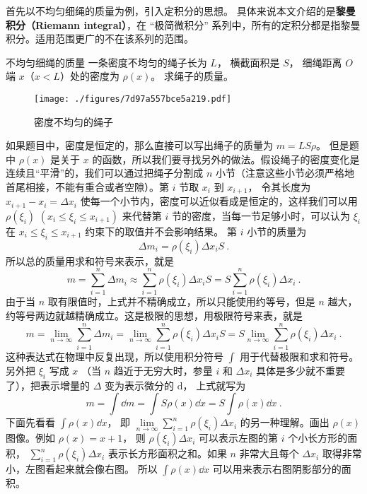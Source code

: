 

首先以不均匀细绳的质量为例，引入定积分的思想。 具体来说本文介绍的是\textbf{黎曼积分（Riemann integral）}，在 “极简微积分” 系列中，所有的定积分都是指黎曼积分。适用范围更广的不在该系列的范围。

\begin{example}{不均匀细绳的质量}\label{ex_DefInt_1}
一条密度不均匀的绳子长为 $L$， 横截面积是 $S$， 细绳距离 $O$ 端 $x$（$x<L$）处的密度为 $\rho(x)$。 求绳子的质量。

\begin{figure}[ht]
\centering
\texttt{[image: ./figures/7d97a557bce5a219.pdf]}
\caption{密度不均匀的绳子} \label{fig_DefInt_1}
\end{figure}

如果题目中，密度是恒定的，那么直接可以写出绳子的质量为 $m = LS\rho$。 但是题中 $\rho(x)$ 是关于 $x$ 的函数，所以我们要寻找另外的做法。假设绳子的密度变化是连续且“平滑”的，我们可以通过把绳子分割成 $n$ 小节（注意这些小节必须严格地首尾相接，不能有重合或者空隙）。第 $i$ 节取 $x_i$ 到 $x_{i +1}$， 令其长度为 $x_{i + 1} - {x_i} = \Delta x_i$ 使每一个小节内，密度可以近似看成是恒定的，这样我们可以用 $\rho(\xi_i)\,\, (x_i \leqslant \xi_i \leqslant x_{i + 1})$ 来代替第 $i$ 节的密度，当每一节足够小时，可以认为 $\xi_i$ 在 $x_i \leqslant \xi_i \leqslant x_{i + 1}$ 约束下的取值并不会影响结果。 第 $i$ 小节的质量为
\begin{equation}
\Delta {m_i} = \rho (\xi_i)\Delta {x_i}S ~.
\end{equation}
所以总的质量用求和符号来表示，就是
\begin{equation}
m = \sum_{i = 1}^n \Delta m_i  \approx \sum_{i = 1}^n \rho(\xi_i)\Delta x_i S   = S \sum_{i = 1}^n \rho (\xi_i)\Delta x_i~.
\end{equation}
由于当 $n$ 取有限值时，上式并不精确成立，所以只能使用约等号，但是 $n$ 越大，约等号两边就越精确成立。这是极限的思想，用极限符号来表，就是
\begin{equation}
m = \lim_{n \to \infty } \sum_{i = 1}^n {\Delta {m_i}}  = \lim_{n \to \infty } \sum_{i = 1}^n \rho(\xi_i)\Delta {x_i}S   = S   \lim_{n \to \infty } \sum_{i = 1}^n \rho(\xi_i)\Delta {x_i}~.
\end{equation}
这种表达式在物理中反复出现，所以使用积分符号 $\int {} $ 用于代替极限和求和符号。另外把 ${\xi_i}$ 写成 $x$ （当 $n$ 趋近于无穷大时，参量 $i$ 和 $\Delta {x_i}$ 具体是多少就不重要了），把表示增量的 $\Delta $ 变为表示微分的 $\mathrm{d}$， 上式就写为
\begin{equation}
m = \int \dd{m}  = \int S\rho(x) \dd{x}  = S\int \rho(x) \dd{x}~.
\end{equation}
下面先看看 $\int \rho(x) \dd{x}$， 即 $\lim\limits_{n \to \infty } \sum\limits_{i = 1}^n \rho(\xi_i)\Delta {x_i}$ 的另一种理解。画出 $\rho (x)$ 图像。例如 $\rho(x) = x + 1$， 则 $\rho(\xi_i)\Delta {x_i}$ 可以表示左图的第 $i$ 个小长方形的面积， $\sum\limits_{i = 1}^n \rho(\xi_i)\Delta x_i$ 表示长方形面积之和。如果 $n$ 非常大且每个 $\Delta x_i$ 取得非常小，左图看起来就会像右图。 所以 $\int \rho(x) \dd{x}$ 可以用来表示右图阴影部分的面积。


\end{example}
